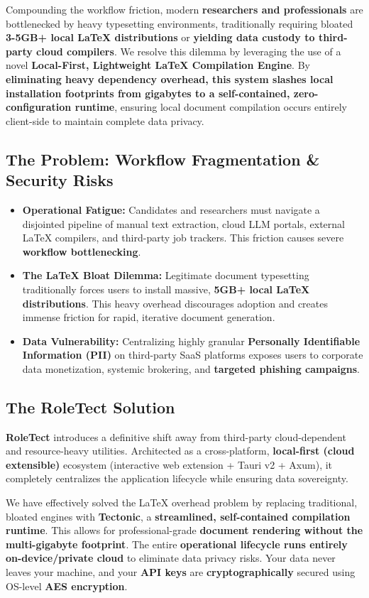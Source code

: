 \documentclass[10pt,a4paper]{article}
\begin{document}
Compounding the workflow friction, modern \textbf{researchers and professionals} are bottlenecked by heavy typesetting environments, traditionally requiring bloated \textbf{3-5GB+ local LaTeX distributions} or \textbf{yielding data custody to third-party cloud compilers}. We resolve this dilemma by leveraging the use of a novel \textbf{Local-First, Lightweight LaTeX Compilation Engine}. By \textbf{eliminating heavy dependency overhead, this system slashes local installation footprints from gigabytes to a self-contained, zero-configuration runtime}, ensuring local document compilation occurs entirely client-side to maintain complete data privacy.


\subsection*{The Problem: Workflow Fragmentation \& Security Risks}
\begin{itemize}
    \item \textbf{Operational Fatigue:} Candidates and researchers must navigate a disjointed pipeline of manual text extraction, cloud LLM portals, external \LaTeX{} compilers, and third-party job trackers. This friction causes severe \textbf{workflow bottlenecking}.
    \item \textbf{The \LaTeX{} Bloat Dilemma:} Legitimate document typesetting traditionally forces users to install massive, \textbf{5GB+ local \LaTeX{} distributions}. This heavy overhead discourages adoption and creates immense friction for rapid, iterative document generation.
    \item \textbf{Data Vulnerability:} Centralizing highly granular \textbf{Personally Identifiable Information (PII)} on third-party SaaS platforms exposes users to corporate data monetization, systemic brokering, and \textbf{targeted phishing campaigns}.
\end{itemize}

\subsection{The RoleTect Solution}
\textbf{RoleTect} introduces a definitive shift away from third-party cloud-dependent and resource-heavy utilities. Architected as a cross-platform, \textbf{local-first (cloud extensible)} ecosystem (interactive web extension + Tauri v2 + Axum), it completely centralizes the application lifecycle while ensuring data sovereignty.

We have effectively solved the \LaTeX{} overhead problem by replacing traditional, bloated engines with \textbf{Tectonic}, a \textbf{streamlined, self-contained compilation runtime}. This allows for professional-grade \textbf{document rendering without the multi-gigabyte footprint}. The entire \textbf{operational lifecycle runs entirely on-device/private cloud} to eliminate data privacy risks. Your data never leaves your machine, and your \textbf{API keys} are \textbf{cryptographically} secured using OS-level \textbf{AES encryption}.
\end{document}
